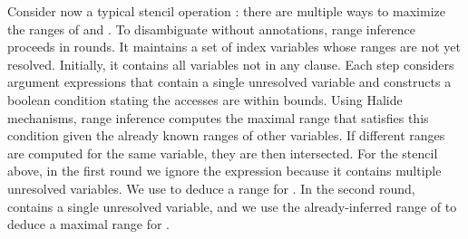 Consider now a typical stencil operation : there are multiple ways to
maximize the ranges of  and .  To disambiguate without annotations, range
inference proceeds in rounds.  It maintains a set of index variables whose
ranges are not yet resolved.  Initially, it contains all variables not in any
 clause.  Each step considers argument expressions that contain a
single unresolved variable and constructs a boolean condition stating the
accesses are within bounds.  Using Halide~\cite{Halide} mechanisms, range
inference computes the maximal range that satisfies this condition given the
already known ranges of other variables.  If different ranges are computed for
the same variable, they are then intersected.  For the stencil above, in the
first round we ignore the expression  because it contains multiple
unresolved variables. We use  to deduce a range for . In the
second round,  contains a single unresolved variable, and we use
the already-inferred range of  to deduce a maximal range for .
